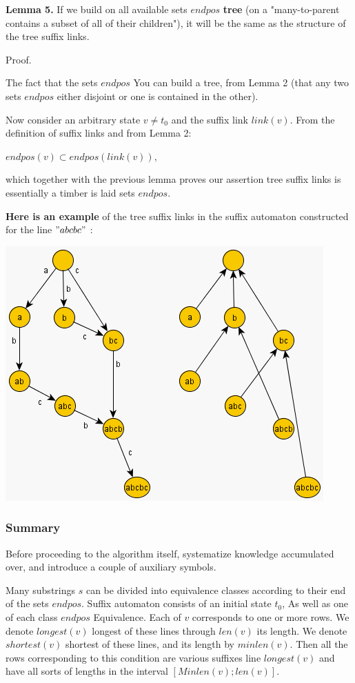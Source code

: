 \textbf{Lemma 5.} If we build on all available sets $endpos$ \textbf{tree} (on a "many-to-parent contains a subset of all of their children"), it will be the same as the structure of the tree suffix links.

Proof.

The fact that the sets $endpos$ You can build a tree, from Lemma 2 (that any two sets $endpos$ either disjoint or one is contained in the other).

Now consider an arbitrary state $v \ne t_0$ and the suffix link $link (v)$. From the definition of suffix links and from Lemma 2:

$endpos (v) \subset endpos (link (v)),$

which together with the previous lemma proves our assertion tree suffix links is essentially a timber is laid sets $endpos$.

\textbf{Here is an example} of the tree suffix links in the suffix automaton constructed for the line $" abcbc"$ :

\includegraphics[scale=0.5]{8.png}

\subsubsection{ Summary }

Before proceeding to the algorithm itself, systematize knowledge accumulated over, and introduce a couple of auxiliary symbols.

Many substrings $s$ can be divided into equivalence classes according to their end of the sets $endpos$.
Suffix automaton consists of an initial state $t_0$, As well as one of each class $endpos$ Equivalence.
Each of $v$ corresponds to one or more rows. We denote $longest (v)$ longest of these lines through $len (v)$ its length. We denote $shortest (v)$ shortest of these lines, and its length by $minlen (v)$.
Then all the rows corresponding to this condition are various suffixes line $longest (v)$ and have all sorts of lengths in the interval $[Minlen (v); len (v)]$.


